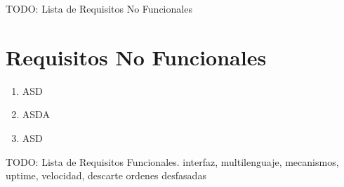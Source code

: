 TODO: Lista de Requisitos No Funcionales


\section{Requisitos No Funcionales\label{sec:req:rnf}}

\begin{enumerate}[label=\bfseries RNF. \arabic*]
  \item ASD
  \item ASDA
  \item ASD
\end{enumerate}

TODO: Lista de Requisitos Funcionales. interfaz, multilenguaje, mecanismos, uptime, velocidad, descarte ordenes desfasadas
